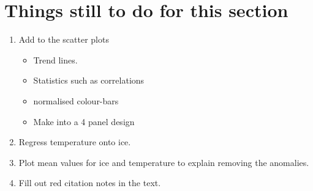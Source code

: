 \documentclass[../main.tex]{subfiles}
\begin{document}
\section*{Things still to do for this section}
\begin{enumerate}
    \item Add to the scatter plots
    \begin{itemize}
        \item Trend lines.
        \item Statistics such as correlations
        \item normalised colour-bars
        \item Make into a 4 panel design
    \end{itemize}
    \item Regress temperature onto ice.
    \item Plot mean values for ice and temperature to explain removing the anomalies.
    \item Fill out red citation notes in the text.
\end{enumerate}
\end{document}
